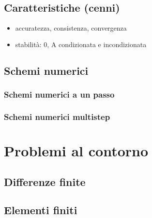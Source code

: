 \documentclass[letterpaper,10pt,italian]{jupyterBook}
\begin{document}
\subsection{Caratteristiche (cenni)}
\label{\detokenize{ch/numerics/ode-cauchy:caratteristiche-cenni}}\begin{itemize}
\item {} 
\sphinxAtStartPar
accuratezza, consistenza, convergenza

\item {} 
\sphinxAtStartPar
stabilità: 0\sphinxhyphen{}, A\sphinxhyphen{} condizionata e incondizionata

\end{itemize}


\subsection{Schemi numerici}
\label{\detokenize{ch/numerics/ode-cauchy:schemi-numerici}}

\subsubsection{Schemi numerici a un passo}
\label{\detokenize{ch/numerics/ode-cauchy:schemi-numerici-a-un-passo}}

\subsubsection{Schemi numerici multi\sphinxhyphen{}step}
\label{\detokenize{ch/numerics/ode-cauchy:schemi-numerici-multi-step}}
\sphinxstepscope


\section{Problemi al contorno}
\label{\detokenize{ch/numerics/ode-boundary:problemi-al-contorno}}\label{\detokenize{ch/numerics/ode-boundary::doc}}

\subsection{Differenze finite}
\label{\detokenize{ch/numerics/ode-boundary:differenze-finite}}

\subsection{Elementi finiti}
\label{\detokenize{ch/numerics/ode-boundary:elementi-finiti}}
\end{document}
